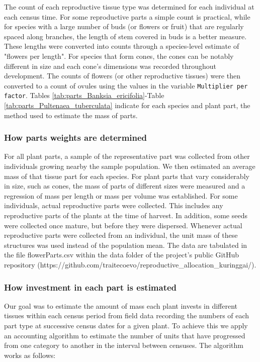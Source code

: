 \documentclass[10pt,twoside]{article}\usepackage[]{graphicx}\usepackage[]{color}
\begin{document}
The count of each reproductive tissue type was determined for each individual at each census time. For some reproductive parts a simple count is practical, while for species with a large number of buds (or flowers or fruit) that are regularly spaced along branches, the length of stem covered in buds is a better measure. These lengths were converted into counts through a species-level estimate of "flowers per length". For species that form cones, the cones can be notably different in size and each cone's dimensions was recorded throughout development. The counts of flowers (or other reproductive tissues) were then converted to a count of ovules using the values in the variable \texttt{Multiplier per factor}. Tables \ref{tab:parts_Banksia_ericifolia}-Table \ref{tab:parts_Pultenaea_tuberculata} indicate for each species and plant part, the method used to estimate the mass of parts.


\subsubsection{How parts weights are determined}

For all plant parts, a sample of the representative part was collected from other individuals growing nearby the sample population. We then estimated an average mass of that tissue part for each species. For plant parts that vary considerably in size, such as cones, the mass of parts of different sizes were measured and a regression of mass per length or mass per volume was established. For some individuals, actual reproductive parts were collected. This includes any reproductive parts of the plants at the time of harvest. In addition, some seeds were collected once mature, but before they were dispersed. Whenever actual reproductive parts were collected from an individual, the unit mass of these structures was used instead of the population mean. The data are tabulated in the file flowerParts.csv within the data folder of the project's public GitHub repository (https://github.com/traitecoevo/reproductive_allocation_kuringgai/).

\subsubsection{How investment in each part is estimated}


Our goal was to estimate the amount of mass each plant invests in different tissues within each census period from field data recording the numbers of each part type at successive census dates for a given plant. To achieve this we apply an accounting algorithm to estimate the number of units that have progressed from one category to another in the interval between censuses. The algorithm works as follows:
\end{document}
